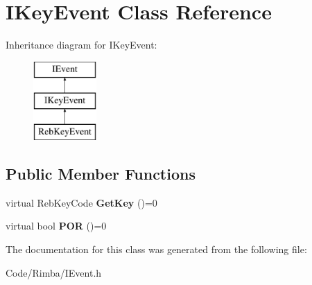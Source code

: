 \hypertarget{class_i_key_event}{}\section{I\+Key\+Event Class Reference}
\label{class_i_key_event}
Inheritance diagram for I\+Key\+Event\+:\begin{figure}[H]
\begin{center}
\leavevmode
\includegraphics[height=3.000000cm]{class_i_key_event}
\end{center}
\end{figure}
\subsection*{Public Member Functions}
\begin{DoxyCompactItemize}
\item 
virtual Reb\+Key\+Code {\bfseries Get\+Key} ()=0\hypertarget{class_i_key_event_ac1bb509d634d0becb89d48978a13a4bf}{}\label{class_i_key_event_ac1bb509d634d0becb89d48978a13a4bf}

\item 
virtual bool {\bfseries P\+OR} ()=0\hypertarget{class_i_key_event_a79250362b1d20b15bb7768449d9eae58}{}\label{class_i_key_event_a79250362b1d20b15bb7768449d9eae58}

\end{DoxyCompactItemize}


The documentation for this class was generated from the following file\+:\begin{DoxyCompactItemize}
\item 
Code/\+Rimba/I\+Event.\+h\end{DoxyCompactItemize}
